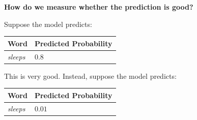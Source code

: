 \begin{flushleft}
    \textcolor{Green3}{ \textbf{How do we measure whether the prediction is good?}}
\end{flushleft}
Suppose the model predicts:
\begin{center}
    \begin{tabular}{@{} l l @{}}
        \toprule
        \textbf{Word} & \textbf{Predicted Probability} \\
        \midrule
        \emph{sleeps} & $0.8$ \\
        \bottomrule
    \end{tabular}
\end{center}
\noindent
This is very good. Instead, suppose the model predicts:
\begin{center}
    \begin{tabular}{@{} l l @{}}
        \toprule
        \textbf{Word} & \textbf{Predicted Probability} \\
        \midrule
        \emph{sleeps} & $0.01$ \\
        \bottomrule
    \end{tabular}
\end{center}

\newpage

